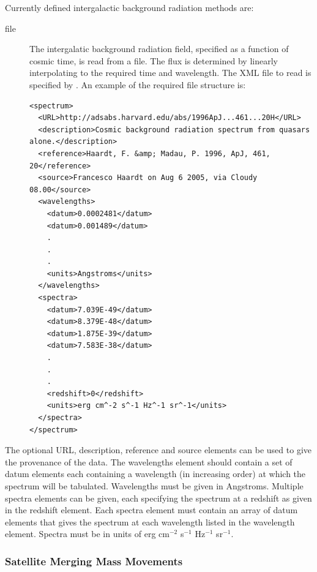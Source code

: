 Currently defined intergalactic background radiation methods are:
\begin{description}
 \item [{\normalfont \ttfamily file}] The intergalatic background radiation field, specified as a function of cosmic time, is read from a file. The flux is determined by linearly interpolating to the required time and wavelength. The XML file to read is specified by {\normalfont \ttfamily [radiationIGBFileName]}. An example of the required file structure is:
 \begin{verbatim}
<spectrum>
  <URL>http://adsabs.harvard.edu/abs/1996ApJ...461...20H</URL>
  <description>Cosmic background radiation spectrum from quasars alone.</description>
  <reference>Haardt, F. &amp; Madau, P. 1996, ApJ, 461, 20</reference>
  <source>Francesco Haardt on Aug 6 2005, via Cloudy 08.00</source>
  <wavelengths>
    <datum>0.0002481</datum>
    <datum>0.001489</datum>
    .
    .
    .
    <units>Angstroms</units>
  </wavelengths>
  <spectra>
    <datum>7.039E-49</datum>
    <datum>8.379E-48</datum>
    <datum>1.875E-39</datum>
    <datum>7.583E-38</datum>
    .
    .
    .
    <redshift>0</redshift>
    <units>erg cm^-2 s^-1 Hz^-1 sr^-1</units>
  </spectra>
</spectrum>
 \end{verbatim}
\end{description}
The optional {\normalfont \ttfamily URL}, {\normalfont \ttfamily description}, {\normalfont \ttfamily reference} and {\normalfont \ttfamily source} elements can be used to give the provenance of the data. The {\normalfont \ttfamily wavelengths} element should contain a set of {\normalfont \ttfamily datum} elements each containing a wavelength (in increasing order) at which the spectrum will be tabulated. Wavelengths must be given in Angstroms. Multiple {\normalfont \ttfamily spectra} elements can be given, each specifying the spectrum at a redshift as given in the {\normalfont \ttfamily redshift} element. Each {\normalfont \ttfamily spectra} element must contain an array of {\normalfont \ttfamily datum} elements that gives the spectrum at each wavelength listed in the {\normalfont \ttfamily wavelength} element. Spectra must be in units of erg cm$^{-2}$ s$^{-1}$ Hz$^{-1}$ sr$^{-1}$.

\subsubsection{Satellite Merging Mass Movements}

